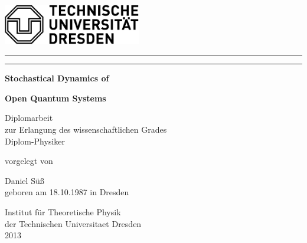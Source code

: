 \thispagestyle{empty}
\vspace{-5em}
\begin{flushleft}
  \includegraphics[angle=0,width=60mm]{img/TU_Logo_SW.pdf}
  \par
\end{flushleft}
\vspace{-3em}
\begin{center}\rule{\textwidth}{0.1ex}\par\end{center}
\vspace{-4em}
\begin{center}\rule{\textwidth}{0.1ex}\par\end{center}

\vfill
\begin{center}\textbf{\Huge Stochastical Dynamics of}\par\end{center}
\begin{center}\textbf{\Huge Open Quantum Systems}\par\end{center}
\vfill
\begin{center}
{\large Diplomarbeit}\\
{\large zur Erlangung des wissenschaftlichen Grades}\\
{\large Diplom-Physiker}\par
\end{center}

\begin{center}vorgelegt von\par\end{center}
\begin{center}{\large Daniel Süß}\\geboren am 18.10.1987 in
Dresden\par
\end{center}
\vspace{13mm}
\begin{center}
{\large Institut für Theoretische Physik}\\
{\large der Technischen Universitaet Dresden}\\
{\large 2013}\par
\end{center}

